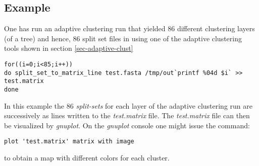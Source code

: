\subsection{Example}
One has run an adaptive clustering run that yielded 86 different
clustering layers (of a tree) and hence, 86 split set files in using
one of the adaptive clustering tools shown in section \ref{sec-adaptive-clust}
\begin{lstlisting}
for((i=0;i<85;i++))
do split_set_to_matrix_line test.fasta /tmp/out`printf %04d $i` >> test.matrix
done
\end{lstlisting}
In this example the 86 \emph{split-sets} for each layer of the
adaptive clustering run are successively as lines written to the
\emph{test.matrix} file.
The \emph{test.matrix} file can then be visualized by \emph{gnuplot}.
On the \emph{gnuplot} console one might issue the command:
\begin{lstlisting}
plot 'test.matrix' matrix with image
\end{lstlisting}
to obtain a map with different colors for each cluster. 
  
